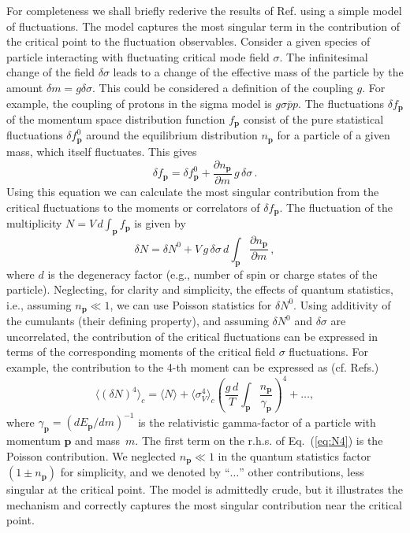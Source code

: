 \documentclass[prl,twocolumn,nofootinbib]{revtex4}
\newcommand\pd{\partial}
\newcommand\p{{\bm{p}}}
\newcommand\la{\langle}
\newcommand\ra{\rangle}
\begin{document}
For completeness we shall briefly rederive the results of
Ref.\cite{Stephanov:2008qz} using a simple model of fluctuations. The model
captures the most singular term in the contribution of
the critical point to the fluctuation observables. Consider a given
species of particle interacting with fluctuating critical mode field
$\sigma$. The infinitesimal change of the field $\delta\sigma$ leads
to a change of the effective mass of the particle by the amount
$\delta m = g \delta \sigma$. This could be considered a definition of
the coupling $g$. For example, the coupling of protons in the sigma
model is $g\sigma \bar p p$.
The fluctuations $\delta f_\p$ of the momentum space
distribution function $f_\p$ consist of the pure statistical
fluctuations $\delta f_\p^0$ around the equilibrium distribution
$n_\p$ for a particle of a given mass, which itself fluctuates. This
gives
\begin{equation}
  \label{eq:3}
  \delta f_\p = \delta f_\p^0 + \frac{\pd n_\p}{\pd m}\, g\,\delta\sigma\,.
\end{equation}
Using this equation we can calculate the most singular contribution
from the critical fluctuations to the moments or correlators of
$\delta f_\p$. The fluctuation of the multiplicity $N=V\,d\int_\p f_\p$ is given by
\begin{equation}
  \label{eq:delta-N}
  \delta N = \delta N^0 + V\, g\, \delta\sigma\,d
\int_{\bm p}  \frac{\pd n_\p}{\pd m}\,,
\end{equation}
where $d$ is the degeneracy factor (e.g., number of spin or charge states of
the particle). Neglecting, for clarity and simplicity, the effects of quantum
statistics, i.e., assuming $n_\p\ll 1$, we can use  Poisson 
statistics for $\delta N^0$. Using additivity of the cumulants 
(their defining property), and assuming $\delta N^0$ and
$\delta\sigma$ are uncorrelated, the contribution of the critical
fluctuations can be expressed in terms of the corresponding moments of the
critical field $\sigma$ fluctuations. For example, 
the contribution to the 4-th moment can be expressed as 
(cf. Refs.\cite{Stephanov:2008qz,Athanasiou:2010kw})
\begin{equation}
  \label{eq:N4}
  \la(\delta N)^4\ra_c = \la N\ra + \la\sigma_V^4\ra_c
\left(\frac{g\,d}{T} \int_{\bm p}\frac{ n_{\bm p}
}{\gamma_{\bm p}}\right)^4 + \ldots,
\end{equation}
where $\gamma_\p = (dE_\p/dm)^{-1}$ is the relativistic gamma-factor of a
particle with momentum $\p$ and mass~$m$.  The first term on the
r.h.s. of Eq.~(\ref{eq:N4}) is the Poisson contribution. We neglected
$n_\p\ll1$ in the quantum statistics factor $(1\pm n_\p)$ for
simplicity, and we denoted by ``$\ldots$'' other contributions, less
singular at the critical point. The model is admittedly crude, but it
illustrates the mechanism and correctly captures 
the most singular contribution near the critical point.
\end{document}

